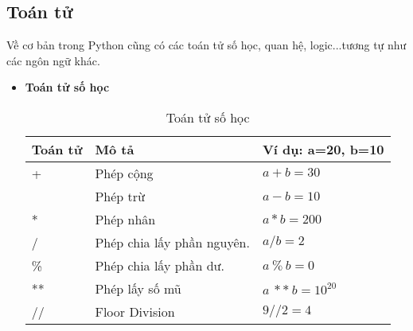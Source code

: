 \documentclass[../main-report.tex]{subfiles}
\begin{document}
\subsection{Toán tử}
Về cơ bản trong Python cũng có các toán tử số học, quan hệ, logic...tương tự như các ngôn ngữ
khác.

\begin{itemize}
\item \textbf{Toán tử số học}
\begin{table}[ht!]
\centering
\begin{tabular}{|>{\centering\arraybackslash}p{2cm}|>{\centering\arraybackslash}p{5cm}|>{\centering\arraybackslash}p{5cm}|}
\hline
\textbf{Toán tử} & \textbf{Mô tả}             & \textbf{Ví dụ: a=20, b=10} \\ \hline
+                & Phép cộng                  & $a+b=30$                   \\ \hline
\-               & Phép trừ                   & $a-b=10$                   \\ \hline
*                & Phép nhân                  & $a*b=200$                  \\ \hline
/                & Phép chia lấy phần nguyên. & $a/b=2$                    \\ \hline
\%               & Phép chia lấy phần dư.     & $a\:\%\:b=0$                   \\ \hline
**               & Phép lấy số mũ             & $a\:**\:b=10^{20}$            \\ \hline
//               & Floor Division             & $9//2=4$                   \\ \hline
\end{tabular}
\caption{Toán tử số học}
\label{tab:toán tử số học}
\end{table}


\end{itemize}
\end{document}
